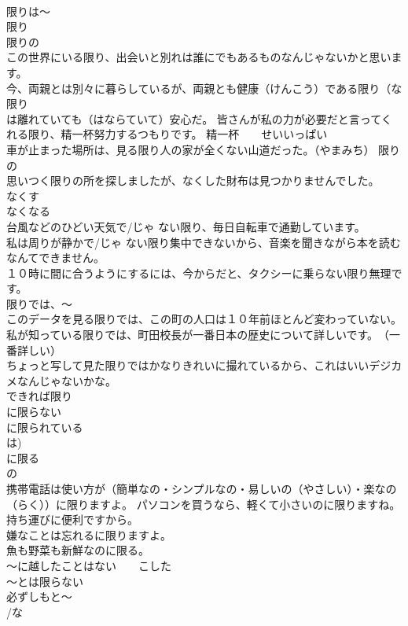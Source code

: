 \documentclass[8pt]{extreport}
\begin{document}
\begin{CJK}{UTF8}{min}
\\	限りは～ 
\\	限り
\\	限りの
\\	この世界にいる限り、出会いと別れは誰にでもあるものなんじゃないかと思います。 
\\	今、両親とは別々に暮らしているが、両親とも健康（けんこう）である限り（な限り 
\\	は離れていても（はならていて）安心だ。 皆さんが私の力が必要だと言ってくれる限り、精一杯努力するつもりです。 精一杯　　せいいっぱい 
\\	車が止まった場所は、見る限り人の家が全くない山道だった。（やまみち） 限りの
\\	思いつく限りの所を探しましたが、なくした財布は見つかりませんでした。 
\\	なくす
\\	なくなる 
\\	台風などのひどい天気で/じゃ ない限り、毎日自転車で通勤しています。 
\\	私は周りが静かで/じゃ ない限り集中できないから、音楽を聞きながら本を読むなんてできません。 
\\	１０時に間に合うようにするには、今からだと、タクシーに乗らない限り無理です。
\\	限りでは、～ 
\\	このデータを見る限りでは、この町の人口は１０年前ほとんど変わっていない。 
\\	私が知っている限りでは、町田校長が一番日本の歴史について詳しいです。　（一番詳しい） 
\\	ちょっと写して見た限りではかなりきれいに撮れているから、これはいいデジカメなんじゃないかな。 
\\	できれば限り　 
\\	に限らない 
\\	に限られている 
\\	は)
\\	に限る 
\\	の 
\\	携帯電話は使い方が（簡単なの・シンプルなの・易しいの（やさしい）・楽なの（らく））に限りますよ。 パソコンを買うなら、軽くて小さいのに限りますね。持ち運びに便利ですから。 
\\	嫌なことは忘れるに限りますよ。 
\\	魚も野菜も新鮮なのに限る。 
\\	～に越したことはない　　こした 
\\	～とは限らない 
\\	必ずしもと～ 
\\	/な

\end{CJK}
\end{document}
